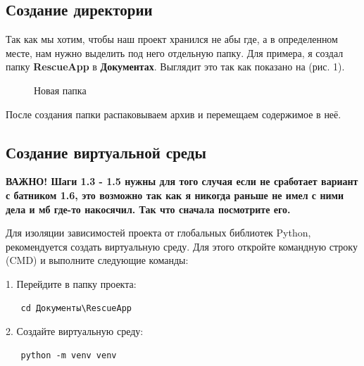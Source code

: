 \documentclass{article}
\begin{document}
\subsection{Создание директории}
Так как мы хотим, чтобы наш проект хранился не абы где, а в определенном месте, нам нужно выделить под него отдельную папку. Для примера, я создал папку \textbf{RescueApp} в \textbf{Документах}. Выглядит это так как показано на (рис. 1).
\begin{figure}[hbt!]
\begin{minipage}[h]{\linewidth}
\end{minipage}
\caption{Новая папка}
\end{figure}

После создания папки распаковываем архив и перемещаем содержимое в неё.

\subsection{Создание виртуальной среды}
\textbf{ВАЖНО! Шаги 1.3 - 1.5 нужны для того случая если не сработает вариант с батником 1.6, это возможно так как я никогда раньше не имел с ними дела и мб где-то накосячил. Так что сначала посмотрите его. }


Для изоляции зависимостей проекта от глобальных библиотек Python, рекомендуется создать виртуальную среду. Для этого откройте командную строку (CMD) и выполните следующие команды:

1. Перейдите в папку проекта:
   \begin{verbatim}
   cd Документы\RescueApp
   \end{verbatim}

2. Создайте виртуальную среду:
   \begin{verbatim}
   python -m venv venv
   \end{verbatim}
\end{document}
